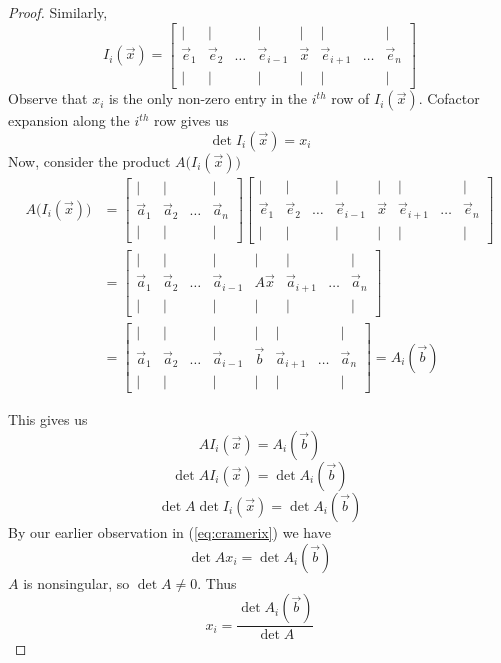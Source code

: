 \documentclass{ximera}
\begin{document}
\begin{proof}
Similarly,
$$I_i(\vec{x})=\begin{bmatrix}
           | & |& &|&|&|&&|\\
        \vec{e}_1 & \vec{e}_2&\dots &\vec{e}_{i-1}&\vec{x}&\vec{e}_{i+1}&\dots&\vec{e}_n\\
        | & |& &|&|&|&&|
         \end{bmatrix}$$
         Observe that $x_i$ is the only non-zero entry in the $i^{th}$ row of $I_i(\vec{x})$.  Cofactor expansion along the $i^{th}$ row gives us
         \begin{equation}\label{eq:cramerix}\det{I_i(\vec{x})}=x_i\end{equation}
Now, consider the product $A\Big(I_i(\vec{x})\Big)$
\begin{align*}A\Big(I_i(\vec{x})\Big)&=\begin{bmatrix}
           | & |& &|\\
        \vec{a}_1 & \vec{a}_2&\dots&\vec{a}_n\\
        | & |& &|
         \end{bmatrix}\begin{bmatrix}
           | & |& &|&|&|&&|\\
        \vec{e}_1 & \vec{e}_2&\dots &\vec{e}_{i-1}&\vec{x}&\vec{e}_{i+1}&\dots&\vec{e}_n\\
        | & |& &|&|&|&&|
         \end{bmatrix}\\
         &=\begin{bmatrix}
           | & |& &|&|&|&&|\\
        \vec{a}_1 & \vec{a}_2&\dots &\vec{a}_{i-1}&A\vec{x}&\vec{a}_{i+1}&\dots&\vec{a}_n\\
        | & |& &|&|&|&&|
         \end{bmatrix}\\
         &=\begin{bmatrix}
           | & |& &|&|&|&&|\\
        \vec{a}_1 & \vec{a}_2&\dots &\vec{a}_{i-1}&\vec{b}&\vec{a}_{i+1}&\dots&\vec{a}_n\\
        | & |& &|&|&|&&|
         \end{bmatrix}=A_i(\vec{b})
\end{align*}
 
This gives us
$$AI_i(\vec{x})=A_i(\vec{b})$$
$$\det{AI_i(\vec{x})}=\det{A_i(\vec{b})}$$
$$\det{A}\det{I_i(\vec{x})}=\det{A_i(\vec{b})}$$
By our earlier observation in (\ref{eq:cramerix}) we have
$$\det{A}x_i=\det{A_i(\vec{b})}$$
$A$ is nonsingular, so $\det{A}\neq 0$.  Thus
$$x_i=\frac{\det{A_i(\vec{b})}}{\det{A}}$$
\end{proof}
 
\end{document}
